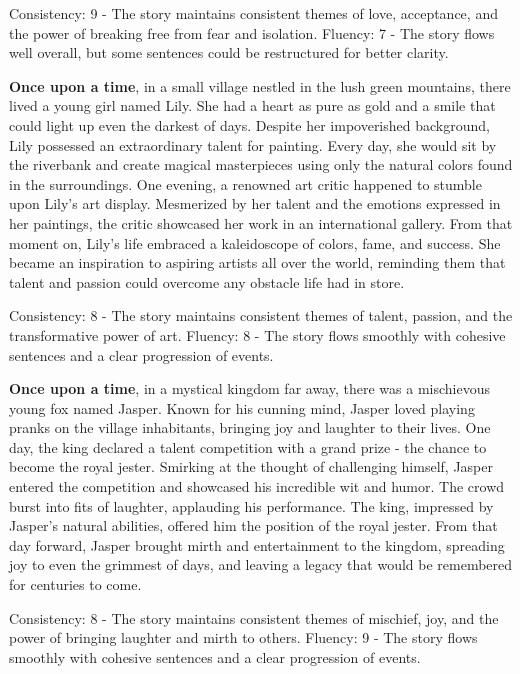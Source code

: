 \documentclass{article}
\begin{document}
Consistency: 9 - The story maintains consistent themes of love, acceptance, and the power of breaking free from fear and isolation.
Fluency: 7 - The story flows well overall, but some sentences could be restructured for better clarity.

\textbf{Once upon a time}, in a small village nestled in the lush green mountains, there lived a young girl named Lily. She had a heart as pure as gold and a smile that could light up even the darkest of days. Despite her impoverished background, Lily possessed an extraordinary talent for painting. Every day, she would sit by the riverbank and create magical masterpieces using only the natural colors found in the surroundings. One evening, a renowned art critic happened to stumble upon Lily's art display. Mesmerized by her talent and the emotions expressed in her paintings, the critic showcased her work in an international gallery. From that moment on, Lily's life embraced a kaleidoscope of colors, fame, and success. She became an inspiration to aspiring artists all over the world, reminding them that talent and passion could overcome any obstacle life had in store.

Consistency: 8 - The story maintains consistent themes of talent, passion, and the transformative power of art.
Fluency: 8 - The story flows smoothly with cohesive sentences and a clear progression of events.

\textbf{Once upon a time}, in a mystical kingdom far away, there was a mischievous young fox named Jasper. Known for his cunning mind, Jasper loved playing pranks on the village inhabitants, bringing joy and laughter to their lives. One day, the king declared a talent competition with a grand prize - the chance to become the royal jester. Smirking at the thought of challenging himself, Jasper entered the competition and showcased his incredible wit and humor. The crowd burst into fits of laughter, applauding his performance. The king, impressed by Jasper's natural abilities, offered him the position of the royal jester. From that day forward, Jasper brought mirth and entertainment to the kingdom, spreading joy to even the grimmest of days, and leaving a legacy that would be remembered for centuries to come.

Consistency: 8 - The story maintains consistent themes of mischief, joy, and the power of bringing laughter and mirth to others.
Fluency: 9 - The story flows smoothly with cohesive sentences and a clear progression of events.
\end{document}
